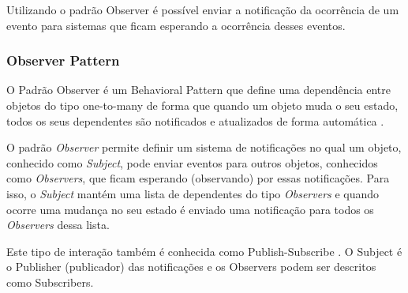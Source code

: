 Utilizando o padrão Observer é possível enviar a notificação da ocorrência de um evento para sistemas que ficam esperando a ocorrência desses eventos.




\subsubsection{Observer Pattern}

O Padrão Observer é um Behavioral Pattern que define uma dependência entre objetos do tipo one-to-many de forma que quando um objeto muda o seu estado, todos os seus dependentes são notificados e atualizados de forma automática \cite{gamma1994design}.

O padrão \textit{Observer} permite definir um sistema de notificações no qual um objeto, conhecido como \textit{Subject}, pode enviar eventos para outros objetos, conhecidos como \textit{Observers}, que ficam esperando (observando) por essas notificações. Para isso, o \textit{Subject} mantém uma lista de dependentes do tipo \textit{Observers} e quando ocorre uma mudança no seu estado é enviado uma notificação para todos os \textit{Observers} dessa lista.

Este tipo de interação também é conhecida como Publish-Subscribe \cite{gamma1994design}. O Subject é o Publisher (publicador) das notificações e os Observers podem ser descritos como Subscribers.

